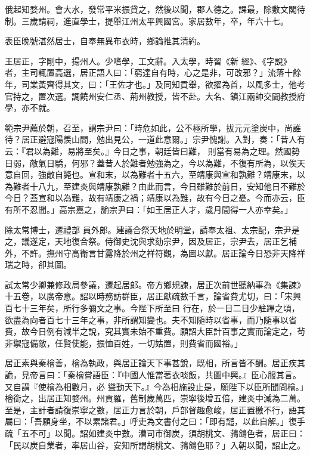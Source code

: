 \begin{pinyinscope}
 俄起知婺州。會大水，發常平米振貸之，然後以聞，郡人德之。課最，除敷文閣待制。三歲請祠，進直學士，提舉江州太平興國宮。家居數年，卒，年六十七。



 表臣晚號湛然居士，自奉無異布衣時，鄉論推其清約。



 王居正，字剛中，揚州人。少嗜學，工文辭。入太學，時習《新
 經》、《字說》者，主司輒置高選，居正語人曰：「窮達自有時，心之是非，可改邪？」流落十餘年，司業黃齊得其文，曰：「王佐才也。」及同知貢舉，欲擢為首，以風多士，他考官持之，置次選。調饒州安仁丞、荊州教授，皆不赴。大名、鎮江兩帥交闢教授府學，亦不就。



 範宗尹薦於朝，召至，謂宗尹曰：「時危如此，公不極所學，拔元元塗炭中，尚誰待？居正避寇陽羨山間，勉出見公，一道此意爾。」宗尹愧謝。入對，奏：「昔人有云：『君以為難，易將至矣。』今日之事，朝廷皆曰難，
 則當有易為之理。然國勢日弱，敵氣日驕，何邪？蓋昔人於難者勉強為之，今以為難，不復有所為，以俟天意自回，強敵自斃也。宣和末，以為難者十五六，至靖康與宣和孰難？靖康末，以為難者十八九，至建炎與靖康孰難？由此而言，今日雖難於前日，安知他日不難於今日？蓋宣和以為難，故有靖康之禍；靖康以為難，故有今日之憂。今而亦云，臣有所不忍聞。」高宗嘉之，諭宗尹曰：「如王居正人才，歲月間得一人亦幸矣。」



 除太常博士，遷禮部
 員外郎。建議合祭天地於明堂，請奉太祖、太宗配，宗尹是之，議遂定，天地復合祭。侍御史沈與求劾宗尹，因及居正，宗尹去，居正乞補外，不許。撫州守高衛言甘露降於州之祥符觀，為圖以獻。居正論今日恐非天降祥瑞之時，卻其圖。



 試太常少卿兼修政局參議，遷起居郎。帝方鄉規諫，居正次前世聽納事為《集諫》十五卷，以廣帝意。詔以時務訪群臣，居正獻疏數千言，論省費尤切，曰：「宋興百七十三年矣，所行多彌文之事。今陛下所至曰
 行在，於一日二日少駐蹕之頃，欲盡為向者百七十三年之事，非所謂知變也。夫不知隨時以省事，而乃隨事以省費，故今日例有減半之說，究其實未始不重費。願詔大臣計百事之實而論定之，茍非禦寇備敵，任賢使能，振恤百姓，一切姑置，則費省而國裕。」



 居正素與秦檜善，檜為執政，與居正論天下事甚銳，既相，所言皆不酬。居正疾其詭，見帝言曰：「秦檜嘗語臣：『中國人惟當著衣啖飯，共圖中興。』臣心服其言。又自謂『使檜為相數月，必
 聳動天下。』今為相施設止是，願陛下以臣所聞問檜。」檜銜之，出居正知婺州。州貢羅，舊制歲萬匹，崇寧後增五倍，建炎中減為二萬。至是，主計者請復崇寧之數，居正力言於朝，戶部督趣愈峻，居正置檄不行，語其屬曰：「吾願身坐，不以累諸君。」呼吏為文書付之曰：「即有譴，以此自解。」復手疏「五不可」以聞。詔如建炎中數。漕司市御炭，須胡桃文、鵓鴿色者，居正曰：「民以炭自業者，率居山谷，安知所謂胡桃文、鵓鴿色耶？」入朝以聞，詔止之。




\end{pinyinscope}
